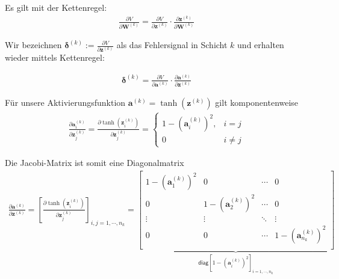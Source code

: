 \documentclass[a4paper, 12pt]{scrartcl}
\begin{document}
\begin{beweis}
    Es gilt mit der Kettenregel:
    \begin{align*}
        \frac{\partial V}{\partial \bm{W}^{(k)}}
        =
        \frac{\partial V}{\partial \bm{z}^{(k)}}
        \cdot 
        \frac{\partial \bm{z}^{(k)}}{\partial \bm{W}^{(k)}}
    \end{align*}

    Wir bezeichnen $\bm{\delta}^{(k)} := \frac{\partial V}{\partial \bm{z}^{(k)}}$ als das Fehlersignal
    in Schicht $k$ und erhalten wieder mittels Kettenregel:

    \begin{align*}
        \bm{\delta}^{(k)}
        =
        \frac{\partial V}{\partial \bm{a}^{(k)}}
        \cdot
        \frac{\partial \bm{a}^{(k)}}{\partial \bm{z}^{(k)}}
    \end{align*}

    Für unsere Aktivierungsfunktion $\bm{a}^{(k)} = \tanh(\bm{z}^{(k)})$ gilt komponentenweise
    \begin{align*}
        \frac{\partial \bm{a}_i^{(k)}}{\partial \bm{z}_j^{(k)}} =
        \frac{\partial \tanh\left( \bm{z}_i^{(k)} \right)}{\partial \bm{z}_j^{(k)}}
        =
        \begin{cases}
            1- \left(\bm{a}_i^{(k)}\right)^2 ,  & i = j     \\
            0                                   & i \neq j
        \end{cases}
    \end{align*}

    Die Jacobi-Matrix ist somit eine Diagonalmatrix
    \begin{align*}
        \frac{\partial \bm{a}^{(k)}}{\partial \bm{z}^{(k)}} 
        =
        \left[
            \frac{\partial \tanh\left( \bm{z}_i^{(k)} \right)}{\partial \bm{z}_j^{(k)}}
        \right]_{i, j =1, \cdots , n_k}
        =
        \underbrace{
            \begin{bmatrix}
                1- \left(\bm{a}_1^{(k)}\right)^2    & 0 & \cdots & 0 \\
                0   & 1- \left(\bm{a}_2^{(k)}\right)^2 & \cdots & 0 \\
                \vdots & \vdots & \ddots & \vdots \\
                0  & 0 & \cdots & 1- \left(\bm{a}_{n_k}^{(k)}\right)^2 \\
            \end{bmatrix}
        }_{
            \mathsf{diag}\left[1- \left(\bm{a}_i^{(k)}\right)^2 \right]_{i=1,\cdots , n_k}
        }
    \end{align*}


\end{beweis}
\end{document}
